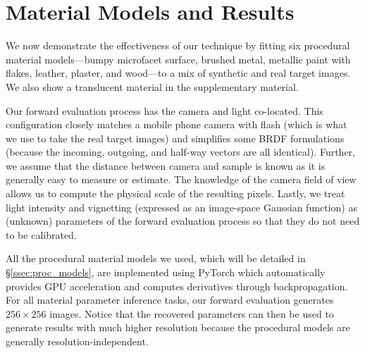 \section{Material Models and Results}
\label{sec:results}
%
We now demonstrate the effectiveness of our technique by fitting six procedural material models---bumpy microfacet surface, brushed metal, metallic paint with flakes, leather, plaster, and wood---to a mix of synthetic and real target images.
We also show a translucent material in the supplementary material.

Our forward evaluation process has the camera and light co-located.
This configuration closely matches a mobile phone camera with flash (which is what we use to take the real target images) and simplifies some BRDF formulations (because the incoming, outgoing, and half-way vectors are all identical).
Further, we assume that the distance between camera and sample is known as it is generally easy to measure or estimate.
The knowledge of the camera field of view allows us to compute the physical scale of the resulting pixels.
Lastly, we treat light intensity and vignetting (expressed as an image-space Gaussian function) as (unknown) parameters of the forward evaluation process so that they do not need to be calibrated.


All the procedural material models we used, which will be detailed in \S\ref{ssec:proc_models}, are implemented using PyTorch which %
automatically provides GPU acceleration and computes derivatives through backpropagation. %
For all material parameter inference tasks, our forward evaluation generates $256 \times 256$ images.
Notice that the recovered parameters can then be used to generate results with much higher resolution because the procedural models are generally resolution-independent.

